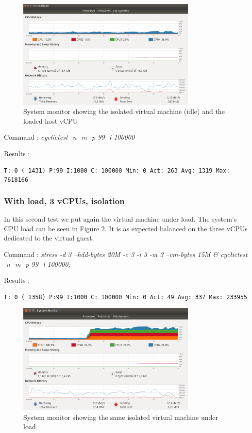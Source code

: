 \documentclass[]{scrartcl}
\begin{document}
\begin{figure}[t]
	\centering
	\includegraphics[width=0.8\textwidth]{test-cpu}
	\caption{System monitor showing the isolated virtual machine (idle) and the loaded host vCPU}
	\label{fig:test-cpu}
\end{figure}


\noindent Command : \textit{cyclictest -n -m -p 99 -l 100000}

\noindent Results :

\noindent \texttt{T: 0 ( 1431) P:99 I:1000 C: 100000 Min:      0 Act:  263 Avg: 1319 Max:  7618166}

\subsubsection{With load, 3 vCPUs, isolation}

In this second test we put again the virtual machine under load. The system's CPU load can be seen in Figure \ref{fig:test-cpuload}. It is as expected balanced on the three vCPUs dedicated to the virtual guest.

\noindent Command : \textit{stress -d 3 --hdd-bytes 20M -c 3 -i 3 -m 3 --vm-bytes 15M \& cyclictest -n -m -p 99 -l 100000;}

\noindent Results : 

\noindent \texttt{T: 0 ( 1358) P:99 I:1000 C: 100000 Min:      0 Act:   49 Avg:  337 Max:   233955}


\begin{figure}[t]
	\centering
	\includegraphics[width=0.8\textwidth]{test-cpuload}
	\caption{System monitor showing the same isolated virtual machine under load}
	\label{fig:test-cpuload}
\end{figure}
\end{document}

